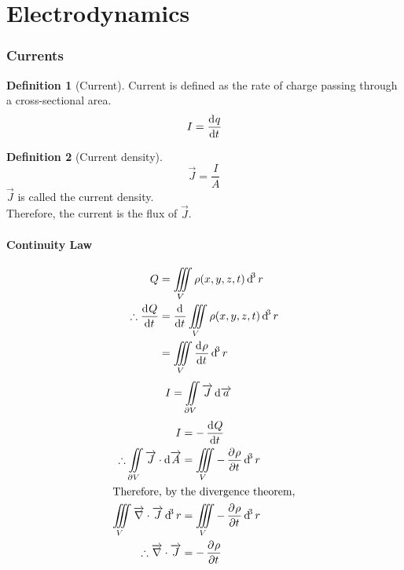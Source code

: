 \documentclass[fleqn, a4paper, 12pt, twoside]{article}
\theoremstyle{definition}
\newtheorem{definition}{Definition}
\theoremstyle{theorem}
\begin{document}
\part{Electrodynamics}

\section{Currents}

\begin{definition}[Current]
	Current is defined as the rate of charge passing through a cross-sectional area.
	\begin{equation*}
		I = \dod{q}{t}
	\end{equation*}
\end{definition}

\begin{definition}[Current density]
	\begin{equation*}
		\overrightarrow{J} = \dfrac{I}{A}
	\end{equation*}
	$\overrightarrow{J}$ is called the current density.\\
	Therefore, the current is the flux of $\overrightarrow{J}$.
\end{definition}

\subsection{Continuity Law}

\begin{align*}
	Q                     & = \iiint\limits_{V} \rho(x,y,z,t) \dif^3 r           \\
	\therefore \dod{Q}{t} & = \dod{}{t} \iiint\limits_{V} \rho(x,y,z,t) \dif^3 r \\
                              & = \iiint\limits_{V} \dod{\rho}{t} \dif^3 r
\end{align*}
\begin{align*}
	I & = \iint\limits_{\partial V} \overrightarrow{J} \dif \overrightarrow{a}
\end{align*}
\begin{align*}
	I                                                                                     & = - \dod{Q}{t}                              \\
	\therefore \iint\limits_{\partial V} \overrightarrow{J} \cdot \dif \overrightarrow{A} & = \iiint\limits_{V} -\dpd{\rho}{t} \dif^3 r \\
	\intertext{Therefore, by the divergence theorem,}
	\iiint\limits_{V} \overrightarrow{\nabla} \cdot \overrightarrow{J} \dif^3 r           & = \iiint\limits_{V} -\dpd{\rho}{t} \dif^3 r \\
	\therefore \overrightarrow{\nabla} \cdot \overrightarrow{J}                           & = -\dpd{\rho}{t}
\end{align*}
\end{document}
